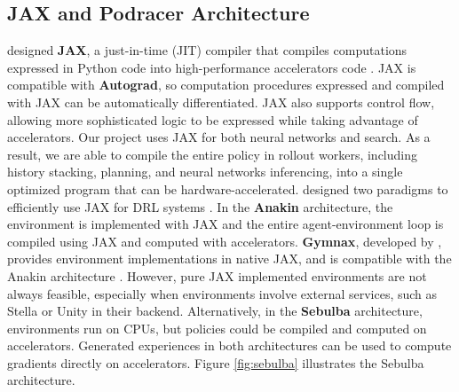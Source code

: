 \subsection{JAX and Podracer Architecture} \label{sec:jax_and_podracer}
\citeauthor{CompilingMachineLearning_Frostig.Johnson.ea_2019} designed \textbf{JAX}, a just-in-time (JIT) compiler that compiles computations expressed in Python code into high-performance accelerators code \cite{CompilingMachineLearning_Frostig.Johnson.ea_2019}.
JAX is compatible with \textbf{Autograd}, so computation procedures expressed and compiled with JAX can be automatically differentiated.
JAX also supports control flow, allowing more sophisticated logic to be expressed while taking advantage of accelerators.
Our project uses JAX for both neural networks and search.
As a result, we are able to compile the entire policy in rollout workers, including history stacking, planning, and neural networks inferencing, into a single optimized program that can be hardware-accelerated.
\citeauthor{PodracerArchitecturesScalable_Hessel.Kroiss.ea_2021} designed two paradigms to efficiently use JAX for DRL systems \cite{PodracerArchitecturesScalable_Hessel.Kroiss.ea_2021}.
In the \textbf{Anakin} architecture, the environment is implemented with JAX and the entire agent-environment loop is compiled using JAX and computed with accelerators.
\textbf{Gymnax}, developed by \citeauthor{GymnaxJAXbasedReinforcement_RobertTjarkoLange_2022}, provides environment implementations in native JAX, and is compatible with the Anakin architecture \cite{GymnaxJAXbasedReinforcement_RobertTjarkoLange_2022}.
However, pure JAX implemented environments are not always feasible, especially when environments involve external services, such as Stella or Unity in their backend.
Alternatively, in the \textbf{Sebulba} architecture, environments run on CPUs, but policies could be compiled and computed on accelerators.
Generated experiences in both architectures can be used to compute gradients directly on accelerators.
Figure \ref{fig:sebulba} illustrates the Sebulba architecture.
